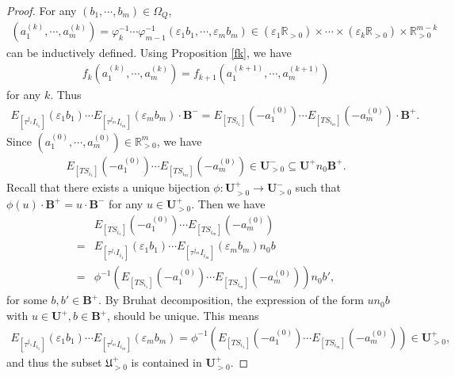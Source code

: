 \documentclass[12pt]{amsart}
\begin{document}
\begin{proof}
    For any $(b_1,\cdots,b_m)\in \Omega_Q$, 
\begin{align*}
    (a_1^{(k)},\cdots,a_m^{(k)})= \varphi_k^{-1}\cdots \varphi_{m-1}^{-1}(\varepsilon_1b_1,\cdots,\varepsilon_mb_m)\in (\varepsilon_1\mathbb{R}_{>0})\times \cdots \times (\varepsilon_k\mathbb{R}_{>0})\times \mathbb{R}_{>0}^{m-k}
\end{align*}
can be inductively defined.
Using Proposition \ref{fk}, we have
\begin{align*}
   f_k(a_1^{(k)},\cdots,a_m^{(k)})=f_{k+1}(a_1^{(k+1)},\cdots,a_m^{(k+1)}) 
\end{align*}
 for any $k$.
Thus 
\begin{align*}
    E_{[\tau^{j_1}I_{i_1}]}(\varepsilon_1b_1) \cdots E_{[\tau^{j_m}I_{i_m}]}(\varepsilon_mb_m)  \cdot \mathbf{B}^-    = E_{[TS_{i_1}]}(-a_1^{(0)})\cdots E_{[TS_{i_m}]}(-a_m^{(0)})\cdot \mathbf{B}^+.
\end{align*}
    Since $(a_1^{(0)},\cdots,a_m^{(0)})\in \mathbb{R}^m_{>0}$, we have
    \begin{align*}
    E_{[TS_{i_1}]}(-a_1^{(0)})\cdots E_{[TS_{i_m}]}(-a_m^{(0)})\in \mathbf{U}^-_{>0} \subseteq \mathbf{U}^+ n_0 \mathbf{B}^+.
    \end{align*} 
Recall that there exists a unique bijection $\phi:\mathbf{U}^+_{>0}\rightarrow \mathbf{U}^-_{>0}$ such that $\phi(u)\cdot \mathbf{B}^+ = u\cdot \mathbf{B}^-$ for any $u\in \mathbf{U}^+_{>0}$.
Then we have 
\begin{align*}
    &E_{[TS_{i_1}]}(-a_1^{(0)})\cdots E_{[TS_{i_m}]}(-a_m^{(0)}) \\
    =& E_{[\tau^{j_1}I_{i_1}]}(\varepsilon_1b_1) \cdots E_{[\tau^{j_m}I_{i_m}]}(\varepsilon_mb_m) n_0 b \\
    =& \phi^{-1}(E_{[TS_{i_1}]}(-a_1^{(0)})\cdots E_{[TS_{i_m}]}(-a_m^{(0)})) n_0 b',
\end{align*}
for some $b,b'\in \mathbf{B}^+$.
By Bruhat decomposition, the expression of the form $un_0b$ with $u\in \mathbf{U}^+,b\in \mathbf{B}^+$, should be unique.
This means 
\begin{align*}
    E_{[\tau^{j_1}I_{i_1}]}(\varepsilon_1b_1) \cdots E_{[\tau^{j_m}I_{i_m}]}(\varepsilon_mb_m) =\phi^{-1}(E_{[TS_{i_1}]}(-a_1^{(0)})\cdots E_{[TS_{i_m}]}(-a_m^{(0)})) \in \mathbf{U}^+_{>0},
\end{align*}
and thus the subset $\mathfrak{U}^+_{>0}$ is contained in $\mathbf{U}^+_{>0}$.


\end{proof}
\end{document}
